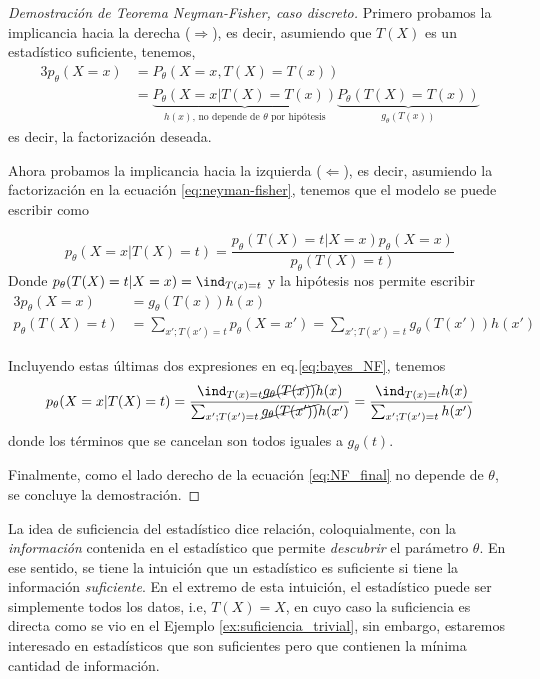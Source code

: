 \begin{proof}[Demostración de Teorema Neyman-Fisher, caso discreto]
Primero probamos la implicancia hacia la derecha ($\Rightarrow$), es decir, asumiendo que $T(X)$ es un estadístico suficiente, tenemos,
	\begin{alignat*}{3}
		p_\theta(X=x) 	&= P_\theta(X=x, T(X)=T(x))\\
						&= \underbrace{P_\theta(X=x| T(X)=T(x))}_{h(x)\text{, no depende de $\theta$ por hipótesis}} \underbrace{P_\theta(T(X)=T(x))}_{g_\theta(T(x))}
	\end{alignat*}
	es decir, la factorización deseada.

	Ahora probamos la implicancia hacia la izquierda ($\Leftarrow$), es decir, asumiendo la factorización en la ecuación \eqref{eq:neyman-fisher}, tenemos que el modelo se puede escribir como 

	\begin{equation*}
		\label{eq:bayes_NF}
		p_\theta(X=x|T(X)=t)=  \frac{p_\theta(T(X)=t|X=x)p_\theta(X=x)}{p_\theta(T(X)=t)}
	\end{equation*}
	Donde $p_\theta(T(X)=t|X=x)= \ind_{T(x)=t}$ y la hipótesis nos permite escribir 
	\begin{alignat*}{3}
		p_\theta(X=x)&=  g_\theta(T(x))h(x)\\
		p_\theta(T(X)=t) &= \sum_{x';T(x')=t}p_\theta(X=x') = \sum_{x';T(x')=t}g_\theta(T(x'))h(x')
	\end{alignat*}

	Incluyendo estas últimas dos expresiones en eq.\eqref{eq:bayes_NF}, tenemos 
	\begin{equation}
		\label{eq:NF_final}
		p_\theta(X=x|T(X)=t)=  \frac{\ind_{T(x)=t}\cancel{g_\theta(T(x))}h(x)}{\sum_{x';T(x')=t}\cancel{g_\theta(T(x'))}h(x')}=  \frac{\ind_{T(x)=t}h(x)}{\sum_{x';T(x')=t}h(x')}
	\end{equation}
	donde los términos que se cancelan son todos iguales a $g_\theta(t)$.

	Finalmente, como el lado derecho de la ecuación \eqref{eq:NF_final} no depende de $\theta$, se concluye la demostración.
\end{proof}

La idea de suficiencia del estadístico dice relación, coloquialmente, con la \textit{información} contenida en el estadístico que permite \textit{descubrir} el parámetro $\theta$. En ese sentido, se tiene la intuición que un estadístico es suficiente si tiene la información \textit{suficiente}. En el extremo de esta intuición, el estadístico puede ser simplemente todos los datos, i.e, $T(X)=X$, en cuyo caso la suficiencia es directa como se vio en el Ejemplo \ref{ex:suficiencia_trivial}, sin embargo, estaremos interesado en estadísticos que son suficientes pero que contienen la mínima cantidad de información. 

